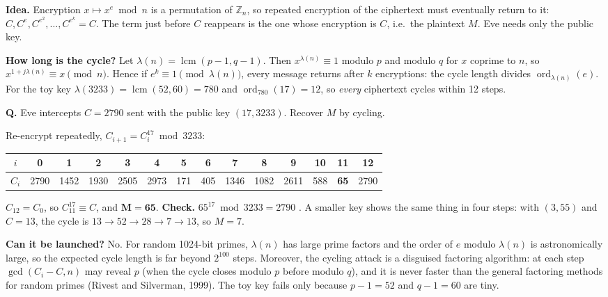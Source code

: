 \textbf{Idea.} Encryption $x \mapsto x^e \bmod n$ is a permutation of $\mathbb{Z}_n$, so repeated encryption of the ciphertext must eventually return to it: $C, C^e, C^{e^2}, \dots, C^{e^k} = C$. The term just before $C$ reappears is the one whose encryption is $C$, i.e.\ the plaintext $M$. Eve needs only the public key.

\textbf{How long is the cycle?} Let $\lambda(n) = \operatorname{lcm}(p - 1, q - 1)$. Then $x^{\lambda(n)} \equiv 1$ modulo $p$ and modulo $q$ for $x$ coprime to $n$, so $x^{1 + j\lambda(n)} \equiv x \pmod n$. Hence if $e^k \equiv 1 \pmod{\lambda(n)}$, every message returns after $k$ encryptions: the cycle length divides $\operatorname{ord}_{\lambda(n)}(e)$. For the toy key $\lambda(3233) = \operatorname{lcm}(52, 60) = 780$ and $\operatorname{ord}_{780}(17) = 12$, so \emph{every} ciphertext cycles within 12 steps.

\begin{worked}
\textbf{Q.} Eve intercepts $C = 2790$ sent with the public key $(17, 3233)$. Recover $M$ by cycling.

Re-encrypt repeatedly, $C_{i+1} = C_i^{17} \bmod 3233$:
\begin{center}\small
\setlength{\tabcolsep}{4pt}
\begin{tabular}{@{}c|ccccccccccccc@{}}
$i$ & 0 & 1 & 2 & 3 & 4 & 5 & 6 & 7 & 8 & 9 & 10 & 11 & 12\\ \midrule
$C_i$ & 2790 & 1452 & 1930 & 2505 & 2973 & 171 & 405 & 1346 & 1082 & 2611 & 588 & \textbf{65} & 2790\\
\end{tabular}
\end{center}
$C_{12} = C_0$, so $C_{11}^{17} \equiv C$, and $\mathbf{M = 65}$. \textbf{Check.} $65^{17} \bmod 3233 = 2790$ \checkmark. A smaller key shows the same thing in four steps: with $(3, 55)$ and $C = 13$, the cycle is $13 \to 52 \to 28 \to 7 \to 13$, so $M = 7$.
\end{worked}

\textbf{Can it be launched?} No. For random 1024-bit primes, $\lambda(n)$ has large prime factors and the order of $e$ modulo $\lambda(n)$ is astronomically large, so the expected cycle length is far beyond $2^{100}$ steps. Moreover, the cycling attack is a disguised factoring algorithm: at each step $\gcd(C_i - C, n)$ may reveal $p$ (when the cycle closes modulo $p$ before modulo $q$), and it is never faster than the general factoring methods for random primes (Rivest and Silverman, 1999). The toy key fails only because $p - 1 = 52$ and $q - 1 = 60$ are tiny.

